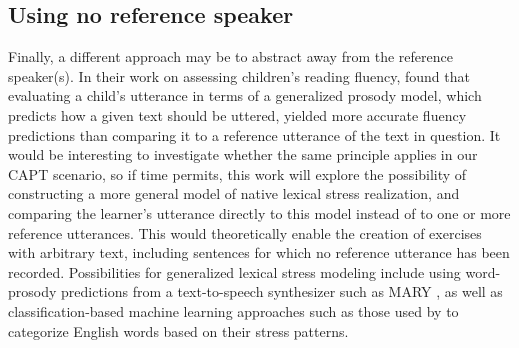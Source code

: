 
	\subsection{Using no reference speaker}
	\label{sec:compare:noref}
	
	Finally, a different approach may be to abstract away from the reference speaker(s). In their work on assessing children's reading fluency, \textcite{Duong2011} found that evaluating a child's utterance in terms of a generalized prosody model, which predicts how a given text should be uttered, yielded more accurate fluency predictions than comparing it to a reference utterance of the text in question. It would be interesting to investigate whether the same principle applies in our CAPT scenario, so if time permits, this work will explore the possibility of constructing a more general model of native lexical stress realization, and comparing the learner's utterance directly to this model instead of to one or more reference utterances. 
This would 
theoretically enable the creation of exercises with arbitrary text, including sentences for which no reference utterance has been recorded. 
%
Possibilities for generalized lexical stress modeling include using word-prosody predictions from a text-to-speech synthesizer such as MARY \citep{Schroeder2003}, as well as
classification-based machine learning approaches such as those used by \textcite{Shahin2012a,Kim2011} to categorize English words based on their stress patterns.
%

